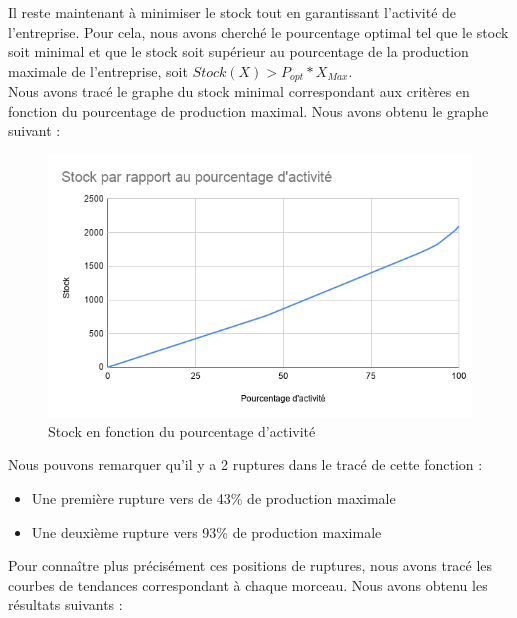 \documentclass{article}
\begin{document}
Il reste maintenant à minimiser le stock tout en garantissant l'activité de l'entreprise. Pour cela, nous avons cherché le pourcentage optimal tel que le stock soit minimal et que le stock soit supérieur au pourcentage de la  production maximale de l'entreprise, soit $Stock(X)> P_{opt}*X_{Max}$.\\
Nous avons tracé le graphe du stock minimal correspondant aux critères en fonction du pourcentage de production maximal. Nous avons obtenu le graphe suivant : 

\begin{center}
\begin{figure}[H]
\includegraphics[width=1\textwidth]{img/Stock_Activite}
\caption{Stock en fonction du pourcentage d'activité}
\end{figure}
\end{center}

Nous pouvons remarquer qu'il y a 2 ruptures dans le tracé de cette fonction : 
\begin{itemize}
\item Une première rupture vers de 43\% de production maximale
\item Une deuxième rupture vers 93\% de production maximale
\end{itemize}

Pour connaître plus précisément ces positions de ruptures, nous avons tracé les courbes de tendances correspondant à chaque morceau. Nous avons obtenu les résultats suivants :
\end{document}
